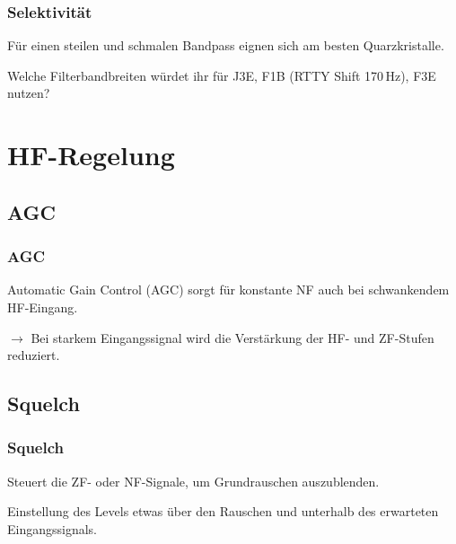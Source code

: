 \begin{frame}
  \frametitle{Selektivität}

  Für einen steilen und schmalen Bandpass eignen sich am besten
  Quarzkristalle.


  \begin{exampleblock}{Welche Filterbandbreiten würdet ihr für J3E, F1B (RTTY Shift 170\,Hz), F3E nutzen?}
  \end{exampleblock}
\end{frame}

\section{HF-Regelung}

\subsection{AGC}

\begin{frame}
  \frametitle{AGC}

  Automatic Gain Control (AGC) sorgt für konstante NF auch bei schwankendem
  HF-Eingang.

  \bigskip

  $\rightarrow$ Bei starkem Eingangssignal wird die Verstärkung der HF- und
  ZF-Stufen reduziert.

\end{frame}

\subsection{Squelch}

\begin{frame}
  \frametitle{Squelch}

  Steuert die ZF- oder NF-Signale, um Grundrauschen auszublenden.

  \bigskip

  Einstellung des Levels etwas über den Rauschen und unterhalb des erwarteten
  Eingangssignals.

\end{frame}

